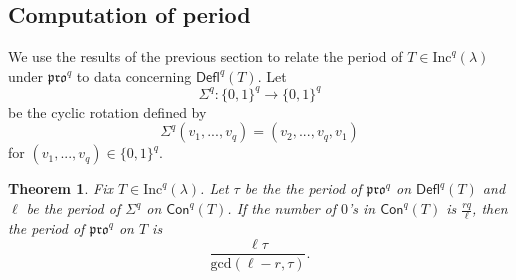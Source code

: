 \documentclass[12pt]{amsart}
\newtheorem{theorem}{Theorem}[section]
\theoremstyle{definition}
\theoremstyle{remark}
\numberwithin{equation}{section}
\newcommand{\inc}{\ensuremath{\mathrm{Inc}}}
\newcommand{\pro}{\mathfrak{pro}}
\newcommand{\deflate}{\ensuremath{\mathsf{Defl}}}
\newcommand{\content}{\ensuremath{\mathsf{Con}}}
\begin{document}
\subsection{Computation of period}\label{sec:period} We use the results of the previous section to relate the period of $T \in \inc^q(\lambda)$ under $\pro^q$ to data concerning $\deflate^q(T)$. Let 
\[\Sigma^q: \lbrace 0,1\rbrace^q \rightarrow \lbrace 0,1\rbrace^q\]
 be the cyclic rotation defined by 
 \[
 \Sigma^q(v_1,...,v_q) = (v_2,...,v_q,v_1)
 \]
  for $(v_1,...,v_q) \in \lbrace 0,1 \rbrace^q$. 
  
\begin{theorem}\label{thm:periodthm}
Fix $T \in \inc^q(\lambda)$. Let $\tau$ be the the period of $\pro^q$ on $\deflate^q(T)$ and $\ell$ be the period of $\Sigma^q$ on $\content^q(T)$. If the number of $0$'s in $\content^q(T)$ is $\frac{rq}{\ell}$, then the period of $\pro^q$ on $T$ is \[\frac{\ell \tau}{\mathrm{gcd}(\ell-r,\tau)}.\]
\end{theorem} 
    
\end{document}
